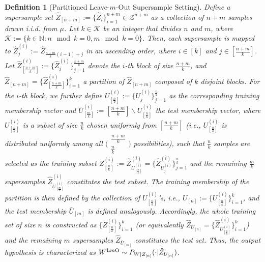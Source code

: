 \documentclass[onecolumn,romanappendices,10pt]{IEEEtran}
\newtheorem{definition}{Definition}
\newcommand{\Kcal}{{\mathcal K}}
\newcommand{\Zcal}{{\mathcal Z}}
\newcommand{\NN}{{\mathbb{N}}}
\begin{document}
	\begin{definition}[Partitioned Leave-$m$-Out Supersample Setting] \label{def:p-lmo}
		Define a supersample set $\hat{Z}_{[n+m]} := \{\hat{Z}_i\}_{i=1}^{n+m} \in \Zcal^{n+m}$ as a collection of $n+m$ samples drawn i.i.d. from $\mu$. Let $k \in \Kcal$ be an integer that divides $n$ and $m$, where $\Kcal := \{ k \in \NN: n \mod k = 0, m \mod k =0 \}$. Then, each supersample is mapped to $\hat{Z}^{(i)}_j := \hat{Z}_{\frac{n+m}{k}(i-1) + j}$ in an ascending order, where $i \in [k]$ and $j \in [\frac{n+m}{k}]$. Let $\hat{Z}^{(i)}_{[\frac{n+m}{k}]} := \{ \hat{Z}^{(i)}_j \}_{j=1}^{\frac{n+m}{k}}$ denote the $i$-th block of size $\frac{n+m}{k}$, and $\hat{Z}_{[n+m]} = \{\hat{Z}^{(i)}_{[\frac{n+m}{k}]}\}_{i=1}^{k}$ a partition of $\hat{Z}_{[n+m]}$ composed of $k$ disjoint blocks. For the $i$-th block, we further define $U^{(i)}_{[\frac{n}{k}]} := \{U^{(i)}_{j}\}_{j=1}^{\frac{n}{k}}$ as the corresponding training membership vector and $\bar{U}^{(i)}_{[\frac{m}{k}]} := [\frac{n+m}{k}] \backslash U^{(i)}_{[\frac{n}{k}]}$ the test membership vector, where $U^{(i)}_{[\frac{n}{k}]}$ is a subset of size $\frac{n}{k}$ chosen uniformly from $[\frac{n+m}{k}]$ (i.e., $U^{(i)}_{[\frac{n}{k}]}$ is distributed uniformly among all $\big(\begin{smallmatrix} \frac{n+m}{k} \\ \frac{n}{k} \end{smallmatrix}\big)$ possibilities), such that $\frac{n}{k}$ samples are selected as the training subset $Z^{(i)}_{[\frac{n}{k}]} := \hat{Z}^{(i)}_{U^{(i)}_{[\frac{n}{k}]}} = \{ \hat{Z}^{(i)}_{U^{(i)}_{j}} \}_{j=1}^{\frac{n}{k}}$ and the remaining $\frac{m}{k}$ supersamples $\hat{Z}^{(i)}_{\bar{U}^{(i)}_{[\frac{m}{k}]}}$ constitutes the test subset. The training membership of the partition is then defined by the collection of $U^{(i)}_{[\frac{n}{k}]}$'s, i.e., $U_{[n]} := \{U^{(i)}_{[\frac{n}{k}]}\}_{i=1}^{k}$, and the test membership $\bar{U}_{[m]}$ is defined analogously. Accordingly, the whole training set of size $n$ is constructed as $\{ Z^{(i)}_{[\frac{n}{k}]} \}_{i=1}^{k}$ (or equivalently $\hat{Z}_{U_{[n]}} = \{ \hat{Z}^{(i)}_{U^{(i)}_{[\frac{n}{k}]}} \}_{i=1}^k$) and the remaining $m$ supersamples $\hat{Z}_{\bar{U}_{[m]}}$ constitutes the test set. Thus, the output hypothesis is characterized as $W^{\textnormal{L$m$O}} \sim P_{W|Z_{[n]}} (\cdot | \hat{Z}_{U_{[n]}})$. 
	\end{definition}
	
\end{document}
